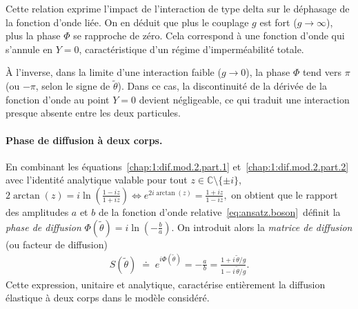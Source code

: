 Cette relation exprime l’impact de l’interaction de type delta sur le déphasage de la fonction d’onde liée. On en déduit que plus le couplage \( g \) est fort (\( g \to \infty \)), plus la phase \( \Phi \) se rapproche de zéro. Cela correspond à une fonction d’onde qui s’annule en \( Y = 0 \), caractéristique d’un régime d’imperméabilité totale.

À l’inverse, dans la limite d’une interaction faible (\( g \to 0 \)), la phase \( \Phi \) tend vers \( \pi \) (ou \( -\pi \), selon le signe de \( \tilde{\theta} \)). Dans ce cas, la discontinuité de la dérivée de la fonction d’onde au point \( Y = 0 \) devient négligeable, ce qui traduit une interaction presque absente entre les deux particules.




\paragraph{Phase de diffusion à deux corps.}

En combinant les équations~\eqref{chap:1:dif.mod.2.part.1} et~\eqref{chap:1:dif.mod.2.part.2} avec l’identité analytique valable pour tout
\(z \in \mathbb{C}\setminus\{\pm i\}\),
\(
2\arctan(z)=i\ln\!\left(\frac{1-iz}{1+iz}\right)
\Leftrightarrow
e^{2i\arctan(z)}=\frac{1+iz}{1-iz},
\)
on obtient que le rapport des amplitudes \(a\) et \(b\) de la fonction
d’onde relative~\eqref{eq:ansatz.boson} définit la {\em phase de diffusion }
\(
\Phi(\tilde{\theta}) = i\ln\!\left(-\frac{b}{a}\right).
\)
On introduit alors la {\em matrice de diffusion} (ou facteur de diffusion)
\begin{eqnarray}
	S(\tilde{\theta}) \;\doteq\; e^{i\Phi(\tilde{\theta})}= -\frac{a}{b}= \frac{1 + i\,\tilde{\theta}/g}{1 - i\,\tilde{\theta}/g}.%
\end{eqnarray}
Cette expression, unitaire et analytique, caractérise entièrement la diffusion élastique à deux corps dans le modèle considéré.



